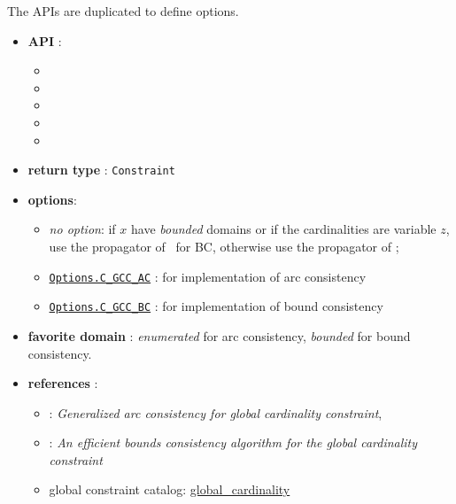 The APIs are duplicated to define options. 

\begin{itemize}
	\item \textbf{API} :
      \begin{itemize}
	\item {}
	\item {}
	\item {}
	\item {}
	\item {}
      \end{itemize}
	\item \textbf{return type} : \texttt{Constraint}
	\item \textbf{options}:
	\begin{itemize}
		\item \emph{no option}: 
          if $x$ have \emph{bounded} domains or if the cardinalities are variable $z$, use the propagator of~\cite{QuimperCP03} for BC, otherwise use the propagator of \cite{ReginAAAI96};
		\item \hyperlink{cgccac:cgccacoptions}{\tt Options.C\_GCC\_AC} : for \cite{ReginAAAI96} implementation of arc consistency
		\item \hyperlink{cgccbc:cgccbcoptions}{\tt Options.C\_GCC\_BC} : for  \cite{QuimperCP03} implementation of bound consistency
	\end{itemize}
	\item \textbf{favorite domain} : \emph{enumerated} for arc consistency, \emph{bounded} for bound consistency.
	\item \textbf{references} :
      \begin{itemize}
      \item \cite{ReginAAAI96}: \emph{Generalized arc consistency for global cardinality constraint},
      \item \cite{QuimperCP03}: \emph{An efficient bounds consistency algorithm for the global cardinality constraint}
      \item global constraint catalog: \href{http://www.emn.fr/x-info/sdemasse/gccat/Cglobal_cardinality.html}{global\_cardinality}
      \end{itemize}
\end{itemize}

